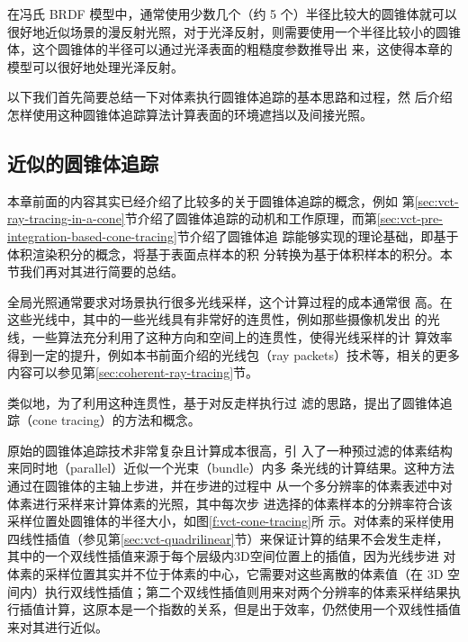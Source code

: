 在冯氏 BRDF 模型中，通常使用少数几个（约 5 个）半径比较大的圆锥体就可以很好地近似场景的漫反射光照，对于光泽反射，则需要使用一个半径比较小的圆锥体，这个圆锥体的半径可以通过光泽表面的粗糙度参数推导出 来，这使得本章的模型可以很好地处理光泽反射。

以下我们首先简要总结一下对体素执行圆锥体追踪的基本思路和过程，然 后介绍怎样使用这种圆锥体追踪算法计算表面的环境遮挡以及间接光照。




\subsection{近似的圆锥体追踪}
本章前面的内容其实已经介绍了比较多的关于圆锥体追踪的概念，例如 第\ref{sec:vct-ray-tracing-in-a-cone}节介绍了圆锥体追踪的动机和工作原理，而第\ref{sec:vct-pre-integration-based-cone-tracing}节介绍了圆锥体追 踪能够实现的理论基础，即基于体积渲染积分的概念，将基于表面点样本的积 分转换为基于体积样本的积分。本节我们再对其进行简要的总结。

全局光照通常要求对场景执行很多光线采样，这个计算过程的成本通常很 高。在这些光线中，其中的一些光线具有非常好的连贯性，例如那些摄像机发出 的光线，一些算法充分利用了这种方向和空间上的连贯性，使得光线采样的计 算效率得到一定的提升，例如本书前面介绍的光线包（ray packets）技术\cite{a:InteractiveRenderingwithCoherentRayTracing}等，相关的更多内容可以参见第\ref{sec:coherent-ray-tracing}节。

类似地，为了利用这种连贯性，\cite{a:RayTracingwithCones}基于对反走样执行过 滤的思路，提出了圆锥体追踪（cone tracing）的方法和概念。

原始的圆锥体追踪技术非常复杂且计算成本很高，\cite{a:Gigavoxels:Avoxelbasedrenderingpipelineforefficientexplorationoflargeanddetailedscenes}引 入了一种预过滤的体素结构来同时地（parallel）近似一个光束（bundle）内多 条光线的计算结果。这种方法通过在圆锥体的主轴上步进，并在步进的过程中 从一个多分辨率的体素表述中对体素进行采样来计算体素的光照，其中每次步 进选择的体素样本的分辨率符合该采样位置处圆锥体的半径大小，如图\ref{f:vct-cone-tracing}所 示。对体素的采样使用四线性插值（参见第\ref{sec:vct-quadrilinear}节）来保证计算的结果不会发生走样，其中的一个双线性插值来源于每个层级内3D空间位置上的插值，因为光线步进 对体素的采样位置其实并不位于体素的中心，它需要对这些离散的体素值（在 3D 空间内）执行双线性插值；第二个双线性插值则用来对两个分辨率的体素采样结果执行插值计算，这原本是一个指数的关系，但是出于效率，仍然使用一个双线性插值来对其进行近似。

